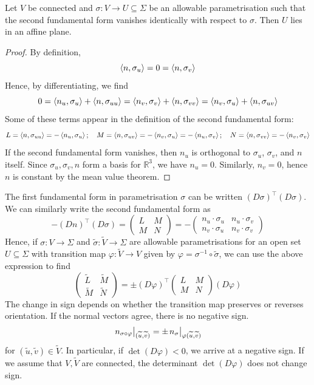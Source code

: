 \documentclass[a4paper,11pt]{article}
\begin{document}
\begin{lemma}
	Let \( V \) be connected and \( \sigma \colon V \to U \subseteq \Sigma \) be an allowable parametrisation such that the second fundamental form vanishes identically with respect to \( \sigma \).
	Then \( U \) lies in an affine plane.
\end{lemma}
\begin{proof}
	By definition,
	\[
		\left\langle{n,\sigma_u}\right\rangle = 0 = \left\langle{n,\sigma_v}\right\rangle
	\]
	Hence, by differentiating, we find
	\[
		0 = \left\langle{n_u, \sigma_u}\right\rangle + \left\langle{n, \sigma_{uu}}\right\rangle = \left\langle{n_v, \sigma_v}\right\rangle + \left\langle{n, \sigma_{vv}}\right\rangle = \left\langle{n_v, \sigma_u}\right\rangle + \left\langle{n,\sigma_{uv}}\right\rangle
	\]
	Some of these terms appear in the definition of the second fundamental form:
	\[
		L = \left\langle{n,\sigma_{uu}}\right\rangle = -\left\langle{n_u, \sigma_u}\right\rangle;\quad M = \left\langle{n,\sigma_{uv}}\right\rangle = -\left\langle{n_v, \sigma_u}\right\rangle = -\left\langle{n_u, \sigma_v}\right\rangle;\quad N = \left\langle{n,\sigma_{vv}}\right\rangle = -\left\langle{n_v, \sigma_v}\right\rangle
	\]
	If the second fundamental form vanishes, then \( n_u \) is orthogonal to \( \sigma_u \), \( \sigma_v \), and \( n \) itself.
	Since \( \sigma_u, \sigma_v, n \) form a basis for \( \mathbb R^3 \), we have \( n_u = 0 \).
	Similarly, \( n_v = 0 \), hence \( n \) is constant by the mean value theorem.
\end{proof}

\begin{remark}
	The first fundamental form in parametrisation \( \sigma \) can be written \( (D \sigma)^\top (D \sigma) \).
	We can similarly write the second fundamental form as
	\[
		-(Dn)^\top (D\sigma) = \begin{pmatrix}
			L & M \\
			M & N
		\end{pmatrix} = -\begin{pmatrix}
			n_u \cdot \sigma_u & n_u \cdot \sigma_v \\
			n_v \cdot \sigma_u & n_v \cdot \sigma_v
		\end{pmatrix}
	\]
	Hence, if \( \sigma \colon V \to \Sigma \) and \( \widetilde \sigma \colon \widetilde V \to \Sigma \) are allowable parametrisations for an open set \( U \subseteq \Sigma \) with transition map \( \varphi \colon \widetilde V \to V \) given by \( \varphi = \sigma^{-1} \circ \widetilde \sigma \), we can use the above expression to find
	\[
		\begin{pmatrix}
			\widetilde L & \widetilde M \\
			\widetilde M & \widetilde N
		\end{pmatrix} = \pm (D\varphi)^\top \begin{pmatrix}
			L & M \\
			M & N
		\end{pmatrix} (D\varphi)
	\]
	The change in sign depends on whether the transition map preserves or reverses orientation.
	If the normal vectors agree, there is no negative sign.
	\[
		\teval{n_{\sigma \circ \varphi}}{(\widetilde u, \widetilde v)} = \pm \teval{n_\sigma}{\varphi(\widetilde u, \widetilde v)}
	\]
	for \( (\widetilde u, \widetilde v) \in \widetilde V \).
	In particular, if \( \det (D \varphi) < 0 \), we arrive at a negative sign.
	If we assume that \( V, \widetilde V \) are connected, the determinant \( \det (D \varphi) \) does not change sign.
\end{remark}
\end{document}
